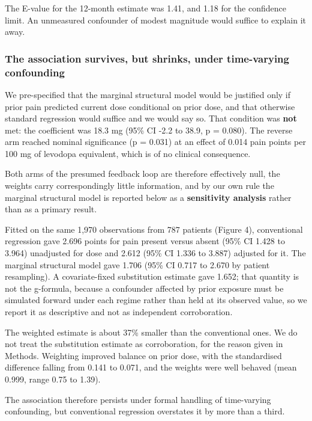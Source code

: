 \documentclass[
  english,
  12pt,
]{article}
\begin{document}
The E-value for the 12-month estimate was 1.41, and 1.18 for the confidence limit. An unmeasured confounder of modest magnitude would suffice to explain it away.

\subsubsection{The association survives, but shrinks, under time-varying confounding}\label{the-association-survives-but-shrinks-under-time-varying-confounding}

We pre-specified that the marginal structural model would be justified only if prior pain predicted current dose conditional on prior dose, and that otherwise standard regression would suffice and we would say so. That condition was \textbf{not} met: the coefficient was 18.3 mg (95\% CI -2.2 to 38.9, p = 0.080). The reverse arm reached nominal significance (p = 0.031) at an effect of 0.014 pain points per 100 mg of levodopa equivalent, which is of no clinical consequence.

Both arms of the presumed feedback loop are therefore effectively null, the weights carry correspondingly little information, and by our own rule the marginal structural model is reported below as a \textbf{sensitivity analysis} rather than as a primary result.

Fitted on the same 1,970 observations from 787 patients (Figure 4), conventional regression gave 2.696 points for pain present versus absent (95\% CI 1.428 to 3.964) unadjusted for dose and 2.612 (95\% CI 1.336 to 3.887) adjusted for it. The marginal structural model gave 1.706 (95\% CI 0.717 to 2.670 by patient resampling). A covariate-fixed substitution estimate gave 1.652; that quantity is not the g-formula, because a confounder affected by prior exposure must be simulated forward under each regime rather than held at its observed value, so we report it as descriptive and not as independent corroboration.

The weighted estimate is about 37\% smaller than the conventional ones. We do not treat the substitution estimate as corroboration, for the reason given in Methods. Weighting improved balance on prior dose, with the standardised difference falling from 0.141 to 0.071, and the weights were well behaved (mean 0.999, range 0.75 to 1.39).

The association therefore persists under formal handling of time-varying confounding, but conventional regression overstates it by more than a third.
\end{document}
